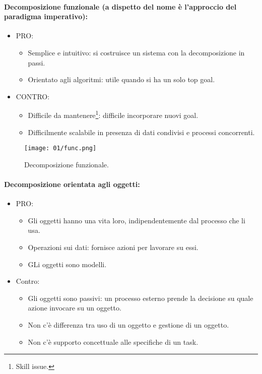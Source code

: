 \paragraph{Decomposizione funzionale (a dispetto del nome è l'approccio del paradigma imperativo):}

\begin{itemize}
  \item PRO:
    \begin{itemize}
      \item Semplice e intuitivo: si costruisce un sistema con la decomposizione in passi. 
      \item Orientato agli algoritmi: utile quando si ha un solo top goal. 
    \end{itemize}
  \item CONTRO:
    \begin{itemize}
      \item Difficile da mantenere\footnote{Skill issue.}: difficile incorporare nuovi goal. 
      \item Difficilmente scalabile in presenza di dati condivisi e processi concorrenti.
    \end{itemize}
\end{itemize}

\begin{figure}[h]
  \centering
  \texttt{[image: 01/func.png]}
  \caption{Decomposizione funzionale.}
\end{figure}

\paragraph{Decomposizione orientata agli oggetti:}

\begin{itemize}
  \item PRO: 
    \begin{itemize}
      \item Gli oggetti hanno una vita loro, indipendentemente dal processo che li usa. 
      \item Operazioni sui dati: fornisce azioni per lavorare su essi. 
      \item GLi oggetti sono modelli.
    \end{itemize}
  \item Contro: 
    \begin{itemize}
      \item Gli oggetti sono passivi: un processo esterno prende la decisione su quale azione invocare su un oggetto. 
      \item Non c'è differenza tra uso di un oggetto e gestione di un oggetto. 
      \item Non c'è supporto concettuale alle specifiche di un task. 
    \end{itemize}
\end{itemize}


